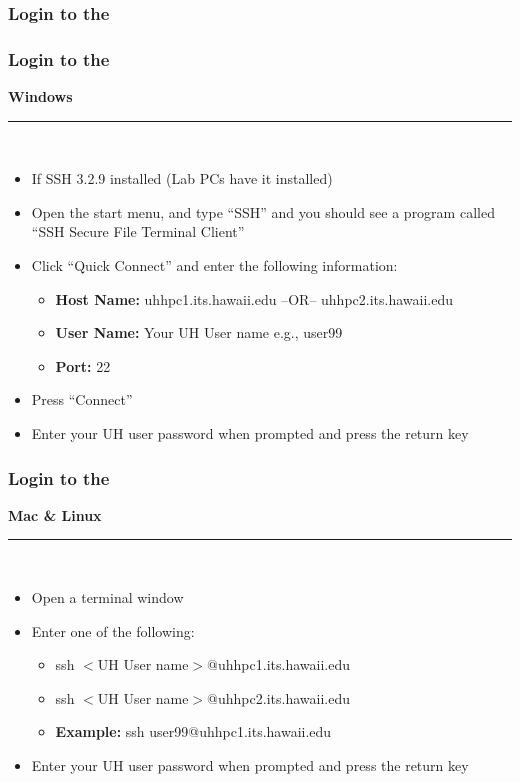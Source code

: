 \subsubsection{Login to the {\craycs}}
\begin{frame}
\frametitle{Login to the {\craycs}}
	\begin{center}\textbf{Windows}\end{center}
	\hrule~\\
	\begin{itemize}
		\item If SSH 3.2.9 installed (Lab PCs have it installed)
		\item Open the start menu, and type ``SSH'' and you should see a program called ``SSH Secure File Terminal Client''
		\item Click ``Quick Connect'' and enter the following information:
			\begin{itemize}
			\item[] \textbf{Host Name:} uhhpc1.its.hawaii.edu --OR-- uhhpc2.its.hawaii.edu
			\item[] \textbf{User Name:} Your UH User name e.g., user99
			\item[] \textbf{Port:} 22
			\end{itemize}
		\item Press ``Connect''
		\item Enter your UH user password when prompted and press the return key
	\end{itemize}
\end{frame}


\begin{frame}
\frametitle{Login to the {\craycs}}
	\begin{center}\textbf{Mac \& Linux}\end{center}
	\hrule~\\
	\begin{itemize}
		\item Open a terminal window
		\item Enter one of the following:
		\begin{itemize}
			\item ssh $<$UH User name$>$@uhhpc1.its.hawaii.edu
			\item ssh $<$UH User name$>$@uhhpc2.its.hawaii.edu
			\item \textbf{Example:} ssh user99@uhhpc1.its.hawaii.edu
		\end{itemize}
		\item Enter your UH user password when prompted and press the return key
	\end{itemize}
\end{frame}


